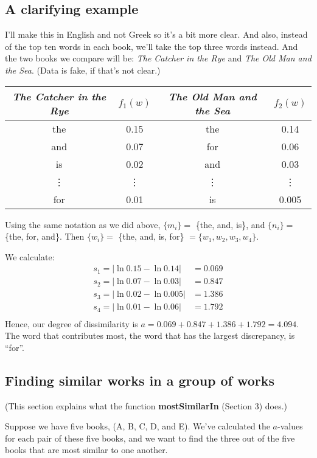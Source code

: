 \documentclass[12pt,letterpaper]{article}
\begin{document}
\subsection{A clarifying example}
I'll make this in English and not Greek so it's a bit more clear.  And also, instead of the top ten words in each book, we'll take the top three words instead.  And the two books we compare will be: \emph{The Catcher in the Rye} and \emph{The Old Man and the Sea}.  (Data is fake, if that's not clear.)
\begin{center}
\begin{tabular}{|c|c|c|c|}
\hline
\emph{The Catcher in the Rye} & $f_1(w)$ & \emph{The Old Man and the Sea} & $f_2(w)$ \\ \hline \hline
the & 0.15 & the & 0.14 \\ \hline
and & 0.07 & for & 0.06 \\ \hline
is & 0.02 & and & 0.03 \\ \hline
\vdots & \vdots & \vdots & \vdots \\ \hline
for & 0.01 & is & 0.005 \\ \hline
\end{tabular}
\end{center}
Using the same notation as we did above, $\{m_i\} = $ \{the, and, is\}, and $\{n_i\} = $ \{the, for, and\}.  Then $\{w_i\} = $ \{the, and, is, for\} $= \{w_1, w_2, w_3, w_4\}.$  

We calculate: 
\begin{align*}
s_1 = |\ln 0.15 -  \ln 0.14| &= 0.069\\
s_2 = |\ln 0.07 - \ln 0.03| &= 0.847\\
s_3 = |\ln 0.02 - \ln 0.005| &= 1.386 \\
s_4 = |\ln 0.01 - \ln 0.06| &= 1.792\\
\end{align*}
Hence, our degree of dissimilarity is $a = 0.069 + 0.847 + 1.386 + 1.792 = 4.094.$  The word that contributes most, the word that has the largest discrepancy, is ``for''.  

\subsection{Finding similar works in a group of works}
(This section explains what the function \textbf{mostSimilarIn} (Section 3) does.)

Suppose we have five books, (A, B, C, D, and E).  We've calculated the $a$-values for each pair of these five books, and we want to find the three out of the five books that are most similar to one another.  
\end{document}
